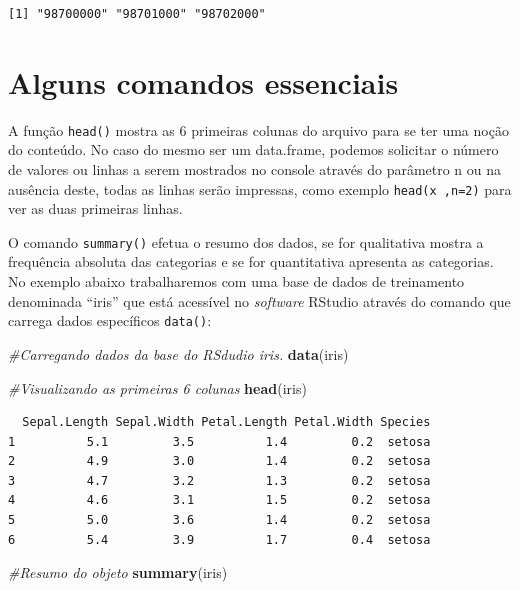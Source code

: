\documentclass[12pt,brazil,oneside]{book}
\newenvironment{Shaded}{\begin{snugshade}}{\end{snugshade}}
\newcommand{\CommentTok}[1]{\textcolor[rgb]{0.56,0.35,0.01}{\textit{#1}}}
\newcommand{\KeywordTok}[1]{\textcolor[rgb]{0.13,0.29,0.53}{\textbf{#1}}}
\newcommand{\NormalTok}[1]{#1}
\begin{document}
\begin{verbatim}
[1] "98700000" "98701000" "98702000"
\end{verbatim}

\hypertarget{alguns-comandos-essenciais}{%
\section{Alguns comandos essenciais}\label{alguns-comandos-essenciais}}

A função \texttt{head()} mostra as 6 primeiras colunas do arquivo para
se ter uma noção do conteúdo. No caso do mesmo ser um data.frame,
podemos solicitar o número de valores ou linhas a serem mostrados no
console através do parâmetro n ou na ausência deste, todas as linhas
serão impressas, como exemplo \texttt{head(x\ ,n=2)} para ver as duas
primeiras linhas.

O comando \texttt{summary()} efetua o resumo dos dados, se for
qualitativa mostra a frequência absoluta das categorias e se for
quantitativa apresenta as categorias. No exemplo abaixo trabalharemos
com uma base de dados de treinamento denominada ``iris'' que está
acessível no \emph{software} RStudio através do comando que carrega
dados específicos \texttt{data()}:

\begin{Shaded}
\begin{Highlighting}[]
\CommentTok{#Carregando dados da base do RSdudio iris.}
\KeywordTok{data}\NormalTok{(iris)}

\CommentTok{#Visualizando as primeiras 6 colunas}
\KeywordTok{head}\NormalTok{(iris)}
\end{Highlighting}
\end{Shaded}

\begin{verbatim}
  Sepal.Length Sepal.Width Petal.Length Petal.Width Species
1          5.1         3.5          1.4         0.2  setosa
2          4.9         3.0          1.4         0.2  setosa
3          4.7         3.2          1.3         0.2  setosa
4          4.6         3.1          1.5         0.2  setosa
5          5.0         3.6          1.4         0.2  setosa
6          5.4         3.9          1.7         0.4  setosa
\end{verbatim}

\begin{Shaded}
\begin{Highlighting}[]
\CommentTok{#Resumo do objeto}
\KeywordTok{summary}\NormalTok{(iris)}
\end{Highlighting}
\end{Shaded}
\end{document}
